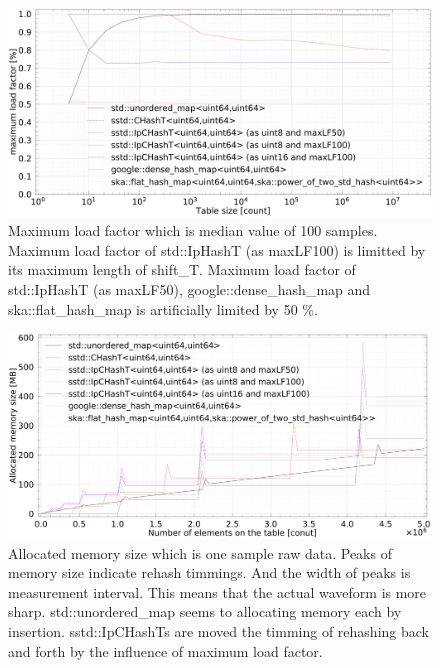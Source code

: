 \begin{figure}[h]
  \includegraphics[scale=0.24]{./fig_bench/maxLoadFactor_med.pdf}
  \caption{
    Maximum load factor which is median value of 100 samples.
    Maximum load factor of std::IpHashT (as maxLF100) is limitted by its maximum length of shift\_T.
    Maximum load factor of std::IpHashT (as maxLF50), google::dense\_hash\_map and ska::flat\_hash\_map is artificially limited by 50 \%.
  }
  \label{fig_bench_LF}
\end{figure}

\begin{figure}[h]
  \hspace{-1mm}
  \includegraphics[scale=0.24]{./fig_bench/usedMemory.pdf}
  \caption{
    Allocated memory size which is one sample raw data.
    Peaks of memory size indicate rehash timmings.
    And the width of peaks is measurement interval.
    This means that the actual waveform is more sharp.
    std::unordered\_map seems to allocating memory each by insertion.
    sstd::IpCHashTs are moved the timming of rehashing back and forth by the influence of maximum load factor.
  }
  \label{fig_bench_memory}
\end{figure}

